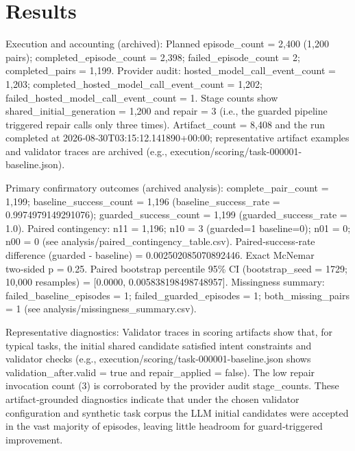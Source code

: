 \documentclass[conference]{IEEEtran}
\begin{document}
\section{Results}
Execution and accounting (archived): Planned episode\_count = 2,400 (1,200 pairs); completed\_episode\_count = 2,398; failed\_episode\_count = 2; completed\_pairs = 1,199. Provider audit: hosted\_model\_call\_event\_count = 1,203; completed\_hosted\_model\_call\_event\_count = 1,202; failed\_hosted\_model\_call\_event\_count = 1. Stage counts show shared\_initial\_generation = 1,200 and repair = 3 (i.e., the guarded pipeline triggered repair calls only three times). Artifact\_count = 8,408 and the run completed at 2026‑08‑30T03:15:12.141890+00:00; representative artifact examples and validator traces are archived (e.g., execution/scoring/task-000001-baseline.json).

Primary confirmatory outcomes (archived analysis): complete\_pair\_count = 1,199; baseline\_success\_count = 1,196 (baseline\_success\_rate = 0.9974979149291076); guarded\_success\_count = 1,199 (guarded\_success\_rate = 1.0). Paired contingency: n11 = 1,196; n10 = 3 (guarded=1 baseline=0); n01 = 0; n00 = 0 (see analysis/paired\_contingency\_table.csv). Paired‑success‑rate difference (guarded - baseline) = 0.002502085070892446. Exact McNemar two‑sided p = 0.25. Paired bootstrap percentile 95\% CI (bootstrap\_seed = 1729; 10,000 resamples) = [0.0000, 0.005838198498748957]. Missingness summary: failed\_baseline\_episodes = 1; failed\_guarded\_episodes = 1; both\_missing\_pairs = 1 (see analysis/missingness\_summary.csv).

Representative diagnostics: Validator traces in scoring artifacts show that, for typical tasks, the initial shared candidate satisfied intent constraints and validator checks (e.g., execution/scoring/task-000001-baseline.json shows validation\_after.valid = true and repair\_applied = false). The low repair invocation count (3) is corroborated by the provider audit stage\_counts. These artifact‑grounded diagnostics indicate that under the chosen validator configuration and synthetic task corpus the LLM initial candidates were accepted in the vast majority of episodes, leaving little headroom for guard‑triggered improvement.
\end{document}
